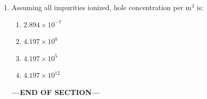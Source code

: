\documentclass[journal,cmex10]{IEEEtran}
\theoremstyle{remark}
\numberwithin{equation}{enumi}
\numberwithin{figure}{enumi}
\begin{document}
\begin{enumerate}[label=\arabic*)]
\vspace{0.5cm}
\item Assuming all impurities ionized, hole concentration per m$^3$ is:  
\vspace{0.2cm}
\hfill{}
\begin{enumerate}[label=\alph*)]
    \item $2.894 \times 10^{-7}$
    \item $4.197 \times 10^{0}$
    \item $4.197 \times 10^{5}$
    \item $4.197 \times 10^{12}$
\end{enumerate}

\bigskip

    \vspace{3\baselineskip}
    \begin{center}
    \textbf{\Large ---END OF SECTION---}
    \end{center}

\end{enumerate}
\end{document}

